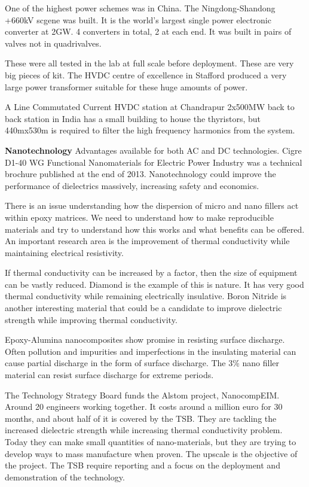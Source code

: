 One of the highest power schemes was in China. 
The Ningdong-Shandong +\-660kV scgene was built. 
It is the world's largest single power electronic converter at 2GW. 
4 converters in total, 2 at each end. It was built in pairs of valves not in quadrivalves. 

These were all tested in the lab at full scale before deployment. 
These are very big pieces of kit. 
The HVDC centre of excellence in Stafford produced a very large power transformer suitable for these huge amounts of power.

A Line Commutated Current HVDC station at Chandrapur 2x500MW back to back station in India has a small building to house the thyristors, but 440mx530m is required to filter the high frequency harmonics from the system.

\textbf{Nanotechnology}
Advantages available for both AC and DC technologies. 
Cigre D1-40 WG Functional Nanomaterials for Electric Power Industry was a technical brochure published at the end of 2013. 
Nanotechnology could improve the performance of dielectrics massively, increasing safety and economics. 

There is an issue understanding how the dispersion of micro and nano fillers act within epoxy matrices. 
We need to understand how to make reproducible materials and try to understand how this works and what benefits can be offered.
 An important research area is the improvement of thermal conductivity while maintaining electrical resistivity. 

If thermal conductivity can be increased by a factor, then the size of equipment can be vastly reduced. 
Diamond is the example of this is nature. 
It has very good thermal conductivity while remaining electrically insulative. 
Boron Nitride is another interesting material that could be a candidate to improve dielectric strength while improving thermal conductivity.

Epoxy-Alumina nanocomposites show promise in resisting surface discharge.
 Often pollution and impurities and imperfections in the insulating material can cause partial discharge in the form of surface discharge. 
The 3\% nano filler material can resist surface discharge for extreme periods.

The Technology Strategy Board funds the Alstom project, NanocompEIM. 
Around 20 engineers working together. 
It costs around a million euro for 30 months, and about half of it is covered by the TSB. 
They are tackling the increased dielectric strength while increasing thermal conductivity problem. 
Today they can make small quantities of nano-materials, but they are trying to develop ways to mass manufacture when proven. 
The upscale is the objective of the project. 
The TSB require reporting and a focus on the deployment and demonstration of the technology.

